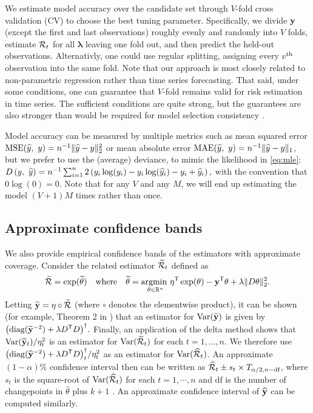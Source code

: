 We estimate model accuracy over the candidate set through $V$-fold cross
validation (CV) to choose the best tuning parameter. Specifically, we divide
$\mathbf{y}$ (except the first and last observations) roughly evenly and randomly into
$V$ folds, estimate $\mathcal{R}_t$ for all $\boldsymbol{\lambda}$ leaving one fold
out, and then predict the held-out observations. Alternativly, one could use
regular splitting, assigning every $v^{\textnormal{th}}$ observation into the same fold. Note
that our approach is most closely related to non-parametric regression rather
than time series forecasting. That said, under some conditions, one can
guarantee that $V$-fold remains valid for risk estimation in time series. The
sufficient conditions are quite strong, but the guarantees are also stronger
than would be required for model selection consistency \citep{BERGMEIR201870}. 


Model accuracy can be measured by multiple metrics such as mean squared error
$\mathrm{MSE}(\widehat{y},\ y) = n^{-1}\lVert \widehat{y} - y \rVert_2^2$ or mean
absolute error $\mathrm{MAE}(\widehat{y},\ y) = n^{-1}\lVert \widehat{y} -
y \rVert_1$, but we prefer to use the (average) deviance, to mimic the likelihood in
\eqref{eq:mle}: $D\left(y,\ \widehat{y}\right) = n^{-1}\sum_{i=1}^n 2\left(y_i \log(y_i) -
y_i\log(\widehat{y}_i) - y_i + \widehat{y}_i\right),$ with the convention that $0\log(0) = 0$.
Note that for any $V$ and any $M$, we will end up estimating the model $(V+1)M$
times rather than once.


\subsection{Approximate confidence bands} 
\label{sec:conf-band} 

We also provide empirical confidence bands of the estimators with  
approximate coverage. Consider the related estimator $\widetilde{\mathcal{R}}_t$
defined as
\begin{equation}
  \widetilde{\mathcal{R}} = \exp(\widetilde{\theta}) \quad\textrm{where}\quad
  \widetilde{\theta} = \underset{\theta\in\mathbb{R}^n}{\operatorname*{argmin}\ } \eta^{\mathsf{T}} \exp(\theta) - \mathbf{y}^{\mathsf{T}}
  \theta + \lambda \lVert D \theta \rVert_2^2.
\end{equation}
Letting $\widetilde{\mathbf{y}} = \eta \circ \widetilde{\mathcal{R}}$ (where $\circ$ denotes the
elementwise product), it can be shown
(for example, Theorem 2 in \cite{vaiter2017degrees}) that an estimator for
$\mathrm{Var}(\widetilde{\mathbf{y}})$ is given by $\big(\mathrm{diag}(\widetilde{\mathbf{y}}^{-2})
+ \lambda D^{\mathsf{T}} D\big)^{\dagger}.$ Finally, an application of the delta
method shows that $\mathrm{Var}(\widetilde{\mathbf{y}}_t) / \eta_t^2$ is an estimator for
$\mathrm{Var}(\widetilde{\mathcal{R}}_t)$ for each $t = 1, \ldots, n$. We therefore use
${\big(\mathrm{diag}(\widehat{\mathbf{y}}^{-2}) + \lambda D^{\mathsf{T}} D\big)}^{\dagger}_t
/ \eta_t^2$ as an estimator for $\mathrm{Var}(\widehat{\mathcal{R}}_t)$. An approximate
$(1-\alpha)\%$ confidence interval then can be written as $\widehat{\mathcal{R}}_t\pm
s_t \times T_{\alpha/2,n-\textrm{df}}$, where $s_t$ is the square-root of
$\mathrm{Var}(\widehat{\mathcal{R}}_t)$ for each $t = 1, \cdots, n$ and $\textrm{df}$ is the
number of changepoints in $\widehat{\theta}$ plus $k+1$
\citep{tibshirani2014adaptive}. An approximate confidence interval of
$\widehat{\mathbf{y}}$ can be computed similarly. 


